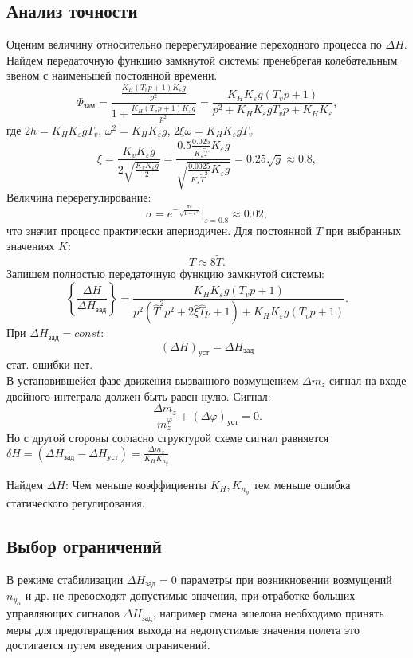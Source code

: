 \documentclass{article}
\begin{document}
\subsection{Анализ точности}
Оценим величину относительно перерегулирование переходного процесса по $\Delta
	H$. Найдем передаточную функцию замкнутой системы пренебрегая колебательным
звеном с наименьшей постоянной времени.
\[
	\Phi_\text{зам} = \frac{\frac{K_H(T_v p + 1) K_\varepsilon g}{p^2}}{1 +
		\frac{K_H(T_v p + 1) K_\varepsilon g}{p^2}} = \frac{K_H K_\varepsilon g(T_v
		p + 1)}{ p^2 +  K_H K_\varepsilon g T_v p +  K_H K_\varepsilon}
	,\]
где $2h = K_H K_\varepsilon g T_v$, $\omega^2 = K_H K_\varepsilon g$, $2 \xi
	\omega = K_H K_\varepsilon g T_v$
\[
	\xi = \frac{K_v K_\varepsilon g}{2 \sqrt{\frac{K_v K_\varepsilon g}{2}}} =
	\frac{0.5 \frac{0.025}{K_\varepsilon \tilde{T}} K_\varepsilon
		g}{\sqrt{\frac{0.0025}{K_\varepsilon \tilde{T}^2} K_\varepsilon  g}} = 0.25
	\sqrt{g} \approx 0.8,
\]
Величина перерегулирование:
\[
	\sigma = e^{- \frac{\pi \varepsilon}{\sqrt{1 - \varepsilon^2}}}
	|_{\varepsilon = 0.8} \approx 0.02,
\]
что значит процесс практически апериодичен. Для постоянной $T$ при выбранных
значениях $K$:
\[
	T \approx 8 \tilde{T}
	.\]
Запишем полностью передаточную функцию замкнутой системы:
\[
	\left\{ \frac{\Delta H }{\Delta H_\text{зад}} \right\}  = \frac{K_H
		K_\varepsilon g (T_v p + 1)}{p^2 (\hat{T}^2 p^2 + 2 \hat{\xi} \hat{T}p + 1)
		+ K_H K_\varepsilon g (T_v p +1)}.
\]
При $\Delta H_\text{зад} = const$:
\[
	(\Delta H)_\text{уст} = \Delta H_\text{зад}
\]
стат. ошибки нет.\\
В установившейся фазе движения вызванного возмущением $ \Delta m_z $ сигнал на
входе двойного интеграла должен быть равен нулю.
Сигнал:
\[
	\frac{\Delta m_z}{m_z^\varphi} + (\Delta \varphi)_\text{уст} = 0
	.\]
Но с другой стороны согласно структурой схеме сигнал равняется $\delta H =
	(\Delta H_\text{зад} - \Delta H_\text{уст}) = \frac{\Delta m_z}{K_H K_{n_y}}$

Найдем $\Delta H$:
Чем меньше коэффициенты $K_H, K_{n_y}$ тем меньше ошибка статического
регулирования.

\subsection{Выбор ограничений}
В режиме стабилизации $\Delta H_\text{зад} = 0$ параметры при возникновении
возмущений $n_{y_\alpha}$ и др. не превосходят допустимые значения, при
отработке больших управляющих сигналов $\Delta H_\text{зад}$, например смена
эшелона необходимо принять меры для предотвращения выхода на недопустимые
значения полета это достигается путем введения ограничений.
\end{document}
